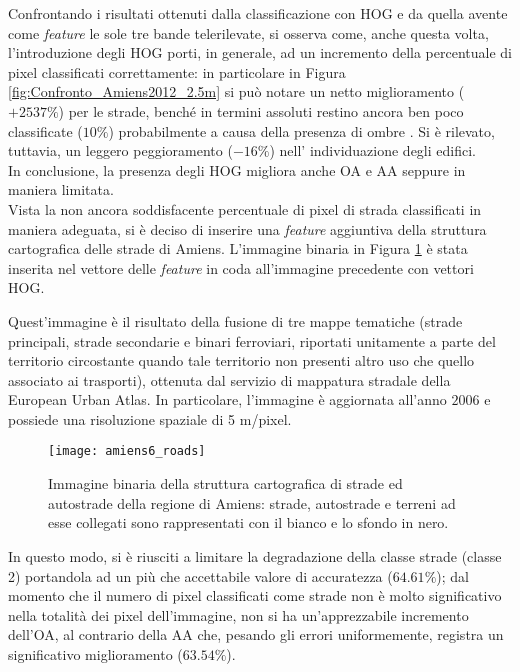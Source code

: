 Confrontando i risultati ottenuti dalla classificazione con HOG e da
quella avente come \emph{feature} le sole tre bande telerilevate, si
osserva come, anche questa volta, l'introduzione degli HOG porti, in
generale, ad un incremento della percentuale di pixel classificati
correttamente: in particolare in Figura
\ref{fig:Confronto_Amiens2012_2.5m} si può notare un netto
miglioramento ($+2537\%$) per le strade, benché in termini assoluti
restino ancora ben poco classificate ($10\%$) probabilmente a causa
della presenza di ombre . Si è rilevato, tuttavia, un leggero
peggioramento ($-16\%$) nell' individuazione degli edifici. \\ In
conclusione, la presenza degli HOG migliora anche OA e AA seppure in
maniera limitata. \\

Vista la non ancora soddisfacente percentuale di pixel di strada
classificati in maniera adeguata, si è deciso di inserire una
\emph{feature} aggiuntiva della struttura cartografica delle strade di
Amiens. L'immagine binaria in Figura \ref{fig:immagine_roads} è stata
inserita nel vettore delle \emph{feature} in coda all'immagine
precedente con vettori HOG.

Quest'immagine è il risultato della fusione di tre mappe tematiche
(strade principali, strade secondarie e binari ferroviari, riportati
unitamente a parte del territorio circostante quando tale territorio
non presenti altro uso che quello associato ai trasporti), ottenuta
dal servizio di mappatura stradale della European Urban Atlas. In
particolare, l'immagine è aggiornata all'anno $2006$ e possiede una
risoluzione spaziale di 5 m/pixel.

\begin{figure}[!ht]
\center
\texttt{[image: amiens6\_roads]}
\caption{Immagine binaria della struttura cartografica di strade ed autostrade della regione di
Amiens: strade, autostrade e terreni ad esse collegati sono rappresentati con il bianco e lo sfondo in
nero.}

\label{fig:immagine_roads}

\end{figure}

In questo modo, si è riusciti a limitare la degradazione della classe
strade (classe 2) portandola ad un più che accettabile valore di
accuratezza ($64.61\%$); dal momento che il numero di pixel
classificati come strade non è molto significativo nella totalità dei
pixel dell'immagine, non si ha un'apprezzabile incremento dell'OA,
al
contrario della AA che, pesando gli errori uniformemente, registra un
significativo miglioramento ($63.54\%$).

